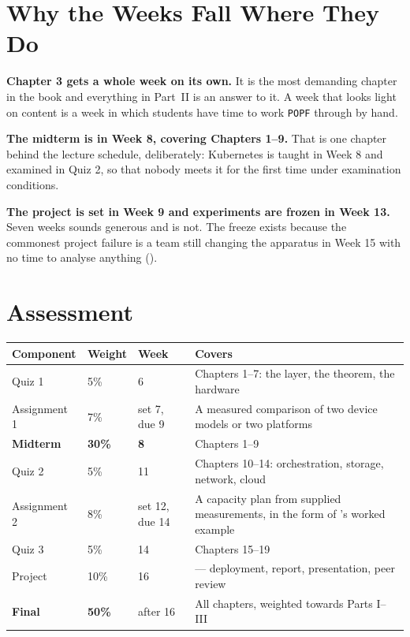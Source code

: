 \section{Why the Weeks Fall Where They Do}

\begin{conceptbox}
\textbf{Chapter 3 gets a whole week on its own.} It is the most demanding
chapter in the book and everything in Part~II is an answer to it. A week that
looks light on content is a week in which students have time to work
\texttt{POPF} through by hand.

\smallskip
\textbf{The midterm is in Week 8, covering Chapters 1--9.} That is one chapter
behind the lecture schedule, deliberately: Kubernetes is taught in Week 8 and
examined in Quiz 2, so that nobody meets it for the first time under
examination conditions.

\smallskip
\textbf{The project is set in Week 9 and experiments are frozen in Week 13.}
Seven weeks sounds generous and is not. The freeze exists because the commonest
project failure is a team still changing the apparatus in Week 15 with no time
to analyse anything ().
\end{conceptbox}

\section{Assessment}

\begin{longtable}{@{}L{3.6cm}L{1.8cm}L{2.2cm}L{7.0cm}@{}}
\toprule
{}
\textbf{Component} & \textbf{Weight} & \textbf{Week} & \textbf{Covers} \\
\midrule
\endhead
Quiz 1 & 5\% & 6 & Chapters 1--7: the layer, the theorem, the hardware \\
Assignment 1 & 7\% & set 7, due 9 & A measured comparison of two device models
or two platforms \\
\textbf{Midterm} & \textbf{30\%} & \textbf{8} & Chapters 1--9 \\
Quiz 2 & 5\% & 11 & Chapters 10--14: orchestration, storage, network, cloud \\
Assignment 2 & 8\% & set 12, due 14 & A capacity plan from supplied
measurements, in the form of 's worked example \\
Quiz 3 & 5\% & 14 & Chapters 15--19 \\
Project & 10\% & 16 &  --- deployment, report, presentation,
peer review \\
\textbf{Final} & \textbf{50\%} & after 16 & All chapters, weighted towards
Parts I--III \\
\bottomrule
\end{longtable}

